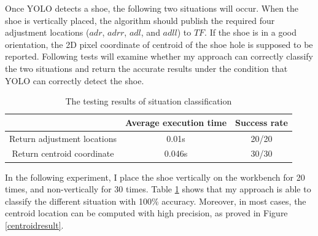 Once YOLO detects a shoe, the following two situations will occur. When the shoe is vertically placed, the algorithm should publish the required four adjustment locations ($adr$, $adrr$, $adl$, and $adll$) to $TF$. If the shoe is in a good orientation, the 2D pixel coordinate of centroid of the shoe hole is supposed to be reported. Following tests will examine whether my approach can correctly classify the two situations and return the accurate results under the condition that YOLO can correctly detect the shoe.

\begin{table}[H]
\centering
\begin{tabular}{||c||c|c||}
\hline
 & Average execution time & Success rate \\ \hline \hline
Return adjustment locations & 0.01s & 20/20 \\ \hline
Return centroid coordinate & 0.046s & 30/30 \\ \hline
\end{tabular}
\caption{The testing results of situation classification}
\label{locationtest}
\end{table}

In the following experiment, I place the shoe vertically on the workbench for 20 times, and non-vertically for 30 times. Table \ref{locationtest} shows that my approach is able to classify the different situation with 100\% accuracy. Moreover, in most cases, the centroid location can be computed with high precision, as proved in Figure \ref{centroidresult}. 

